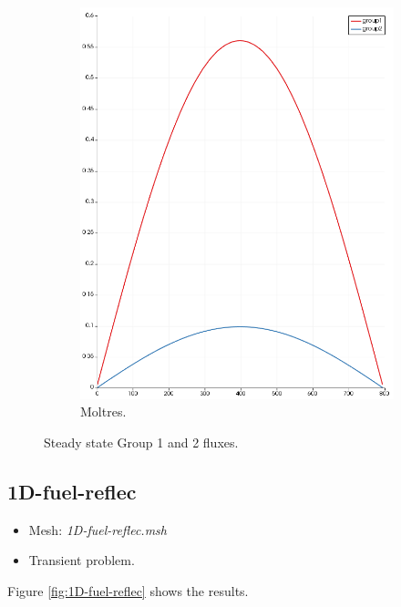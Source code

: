 \documentclass[11pt,letterpaper]{article}
\begin{document}
\begin{figure}[htbp!]
\begin{subfigure}[t]{0.4\textwidth}
			\includegraphics[width=\linewidth]{1D-fuel-eig}
			\caption{Moltres.}
		\end{subfigure}
		\hfill
		\caption{Steady state Group 1 and 2 fluxes.}
		\label{fig:1D-fuel-eig}
	\end{figure}

\subsection{1D-fuel-reflec}

	\begin{itemize}
		\item Mesh: \textit{1D-fuel-reflec.msh}
		\item Transient problem.
	\end{itemize}

Figure \ref{fig:1D-fuel-reflec} shows the results.
\end{document}
